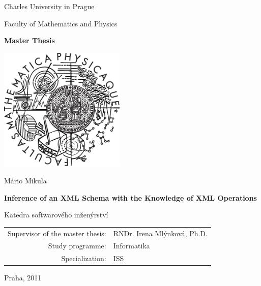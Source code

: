 \documentclass[12pt,a4paper]{report}
\def\mftitle{Inference of an XML Schema with the Knowledge of XML Operations}
\def\mfthesistype{Master Thesis}
\def\mfauthor{Mário Mikula}
\def\mfadvisor{RNDr. Irena Mlýnková, Ph.D.}
\def\mfplacedate{Praha, 2011}
\begin{document}


\pagestyle{empty}
\begin{center}

\large

Charles University in Prague

\medskip

Faculty of Mathematics and Physics

\vfill

{\bf\Large \mfthesistype}

\vfill

\centerline{\mbox{\includegraphics[width=60mm]{logo.eps}}}

\vfill
\vspace{5mm}

{\LARGE \mfauthor}

\vspace{15mm}

{\LARGE\bfseries \mftitle}

\vfill

Katedra softwarového inženýrství

\vfill

\begin{tabular}{rl}

Supervisor of the master thesis: & \mfadvisor \\
\noalign{\vspace{2mm}}
Study programme: & Informatika \\
\noalign{\vspace{2mm}}
Specialization: & ISS \\
\end{tabular}

\vfill

\mfplacedate

\end{center}
\end{document}
